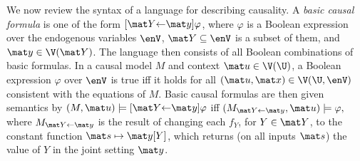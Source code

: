 We now review the syntax of a language for describing causality. 
A \emph{basic causal formula} is one of the form $[\mat Y {\gets}
    \mat y]\varphi$, where $\varphi$ is a Boolean expression over the
endogenous variables $\enV$, $\mat Y \subseteq \enV$ is a subset of them, and $\mat y \in \V(\mat Y)$.
The language
then consists of all Boolean combinations 
 of basic formulas.
In a causal model $M$ and context $\mat u \in \V(\U)$, 
a Boolean expression $\varphi$ over $\enV$ is true iff it holds
for all $(\mat u, \mat x) \in \V(\U,\enV)$ consistent with the equations of $M$.  
Basic causal formulas are then given semantics by
$
    (M, \mat u) \models [\mat Y {\gets} \mat y]\varphi
$ iff $
    (M_{
    \mat Y \gets \mat y}, \mat u) \models \varphi,
$
where $M_{\mat Y \gets \mat y}$ is the result of changing each $f_Y$, for $Y \in \mat Y$, to
the constant function $\mat s \mapsto \mat y[Y]$, 
which returns (on all inputs $\mat s$) the value of $Y$ in the joint setting $\mat y$.
